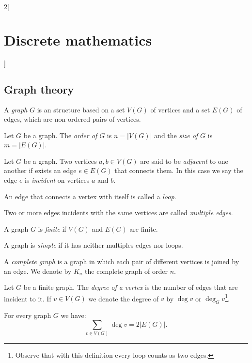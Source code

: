 \documentclass[../../../main.tex]{subfiles}
\begin{document}
\begin{multicols}{2}[\section{Discrete mathematics}]
\subsection{Graph theory}
\begin{definition}
A \textit{graph} $G$ is an structure based on a set $V(G)$ of vertices and a set $E(G)$ of edges, which are non-ordered pairs of vertices.
\end{definition}
\begin{definition}
Let $G$ be a graph. The \textit{order of $G$} is $n=|V(G)|$ and the \textit{size of $G$} is $m=|E(G)|$.
\end{definition}
\begin{definition}
Let $G$ be a graph. Two vertices $a,b\in V(G)$ are said to be \textit{adjacent} to one another if exists an edge $e\in E(G)$ that connects them. In this case we say the edge $e$ is \textit{incident} on vertices $a$ and $b$.
\end{definition}
\begin{definition}
An edge that connects a vertex with itself is called a \textit{loop}.
\end{definition}
\begin{definition}
Two or more edges incidents with the same vertices are called \textit{multiple edges}.
\end{definition}
\begin{definition}
A graph $G$ is \textit{finite} if $V(G)$ and $E(G)$ are finite.
\end{definition}
\begin{definition}
A graph is \textit{simple} if it has neither multiples edges nor loops.
\end{definition}
\begin{definition}
A \textit{complete graph} is a graph in which each pair of different vertices is joined by an edge. We denote by $K_n$ the complete graph of order $n$.
\end{definition}
\begin{definition}
Let $G$ be a finite graph. The \textit{degree of a vertex} is the number of edges that are incident to it. If $v\in V(G)$ we denote the degree of $v$ by $\deg v$ or $\deg_Gv$\footnote{Observe that with this definition every loop counts as two edges.}.
\end{definition}
\begin{lemma}
For every graph $G$ we have: $$\sum_{v\in V(G)}\deg v=2|E(G)|.$$
\end{lemma}
\begin{corollary}

\end{corollary}
\end{multicols}
\end{document}
